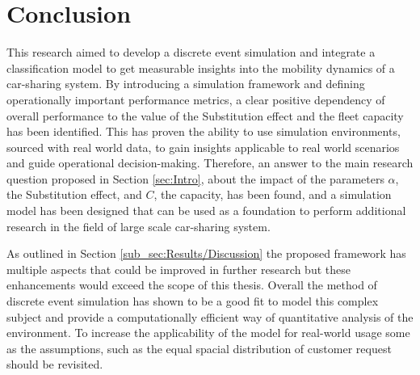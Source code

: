 \section{Conclusion}
\label{sec:Conclusion}

This research aimed to develop a discrete event simulation and integrate a classification model
to get measurable insights into the mobility dynamics of a car-sharing system. By introducing a
simulation framework and defining operationally important performance metrics, a clear
positive dependency of overall performance to the value of the Substitution effect and the
fleet capacity has been identified. This has proven the ability to use simulation environments, 
sourced with real world data, to gain insights applicable to real world scenarios and guide
operational decision-making. Therefore, an answer to the main research question proposed in Section \ref{sec:Intro},
about the impact of the parameters $\alpha$, the Substitution effect, and $C$, the capacity,
has been found, and a simulation model has been designed 
that can be used as a foundation to perform additional research in the field of large
scale car-sharing system.


As outlined in Section \ref{sub_sec:Results/Discussion} the
proposed framework has multiple aspects that could be improved in further research but these
enhancements would
exceed the scope of this thesis. Overall the method of discrete event simulation has shown to be a
good fit to model this complex subject and provide a computationally efficient way of
quantitative analysis of the environment. To increase the applicability of the model for real-world
usage some as the assumptions, such as the equal spacial distribution of customer request should be
revisited.